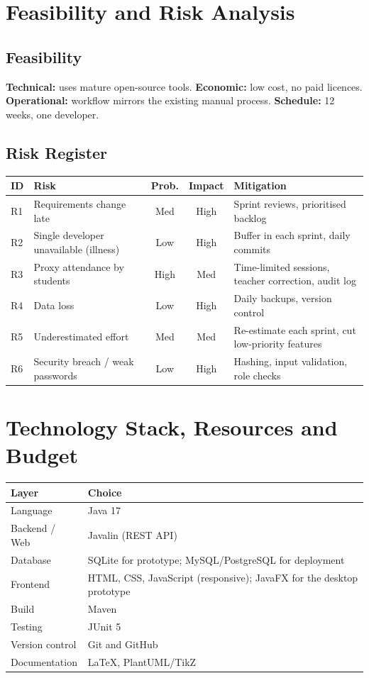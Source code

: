 \documentclass[11pt,a4paper]{article}
\begin{document}
\section{Feasibility and Risk Analysis}
\subsection{Feasibility}
\textbf{Technical:} uses mature open-source tools. \textbf{Economic:} low cost, no paid licences.
\textbf{Operational:} workflow mirrors the existing manual process. \textbf{Schedule:} 12 weeks, one developer.

\subsection{Risk Register}
\begin{tabularx}{\textwidth}{|l|X|c|c|X|}
\hline
\textbf{ID} & \textbf{Risk} & \textbf{Prob.} & \textbf{Impact} & \textbf{Mitigation}\\
\hline
R1 & Requirements change late & Med & High & Sprint reviews, prioritised backlog\\ \hline
R2 & Single developer unavailable (illness) & Low & High & Buffer in each sprint, daily commits\\ \hline
R3 & Proxy attendance by students & High & Med & Time-limited sessions, teacher correction, audit log\\ \hline
R4 & Data loss & Low & High & Daily backups, version control\\ \hline
R5 & Underestimated effort & Med & Med & Re-estimate each sprint, cut low-priority features\\ \hline
R6 & Security breach / weak passwords & Low & High & Hashing, input validation, role checks\\
\hline
\end{tabularx}

\section{Technology Stack, Resources and Budget}
\begin{tabularx}{\textwidth}{|l|X|}
\hline
\textbf{Layer} & \textbf{Choice}\\
\hline
Language & Java 17\\ \hline
Backend / Web & Javalin (REST API)\\ \hline
Database & SQLite for prototype; MySQL/PostgreSQL for deployment\\ \hline
Frontend & HTML, CSS, JavaScript (responsive); JavaFX for the desktop prototype\\ \hline
Build & Maven\\ \hline
Testing & JUnit 5\\ \hline
Version control & Git and GitHub\\ \hline
Documentation & \LaTeX{}, PlantUML/TikZ\\
\hline
\end{tabularx}
\end{document}
